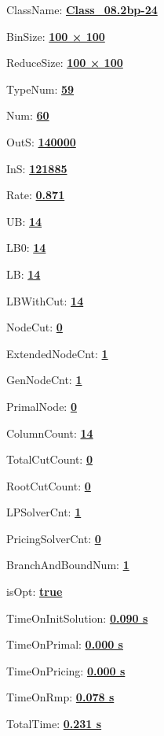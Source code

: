 \documentclass[11pt]{article}
\begin{document}
\pagestyle{empty}


ClassName: \underline{\textbf{Class_08.2bp-24}}
\par
BinSize: \underline{\textbf{100 × 100}}
\par
ReduceSize: \underline{\textbf{100 × 100}}
\par
TypeNum: \underline{\textbf{59}}
\par
Num: \underline{\textbf{60}}
\par
OutS: \underline{\textbf{140000}}
\par
InS: \underline{\textbf{121885}}
\par
Rate: \underline{\textbf{0.871}}
\par
UB: \underline{\textbf{14}}
\par
LB0: \underline{\textbf{14}}
\par
LB: \underline{\textbf{14}}
\par
LBWithCut: \underline{\textbf{14}}
\par
NodeCut: \underline{\textbf{0}}
\par
ExtendedNodeCnt: \underline{\textbf{1}}
\par
GenNodeCnt: \underline{\textbf{1}}
\par
PrimalNode: \underline{\textbf{0}}
\par
ColumnCount: \underline{\textbf{14}}
\par
TotalCutCount: \underline{\textbf{0}}
\par
RootCutCount: \underline{\textbf{0}}
\par
LPSolverCnt: \underline{\textbf{1}}
\par
PricingSolverCnt: \underline{\textbf{0}}
\par
BranchAndBoundNum: \underline{\textbf{1}}
\par
isOpt: \underline{\textbf{true}}
\par
TimeOnInitSolution: \underline{\textbf{0.090 s}}
\par
TimeOnPrimal: \underline{\textbf{0.000 s}}
\par
TimeOnPricing: \underline{\textbf{0.000 s}}
\par
TimeOnRmp: \underline{\textbf{0.078 s}}
\par
TotalTime: \underline{\textbf{0.231 s}}
\par
\newpage


\end{document}
